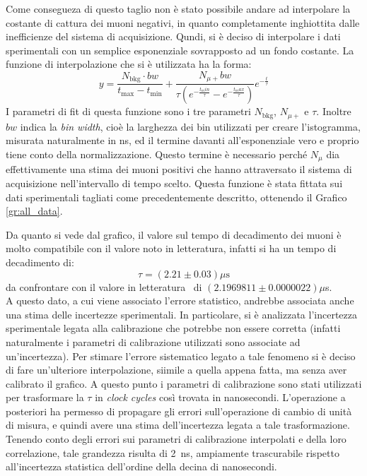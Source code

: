 Come consegueza di questo taglio non è stato possibile andare ad interpolare la costante di cattura dei muoni negativi, in quanto completamente inghiottita dalle inefficienze del sistema di acquisizione. Qundi, si è deciso di interpolare i dati sperimentali con un semplice esponenziale sovrapposto ad un fondo costante. La funzione di interpolazione che si è utilizzata ha la forma:
\begin{equation}
  y = \frac{N_\text{bkg} \cdot bw}{t_\text{max}-t_\text{min}}+\frac{N_{\mu+}bw}{\tau \left(e^{-\frac{t_min}{\tau}} - e^{-\frac{t_max}{\tau}}\right)}
  e^{-\frac{t}{\tau}} 
\end{equation}
I parametri di fit di questa funzione sono i tre parametri $N_\text{bkg}$, $N_{\mu+}$ e $\tau$. Inoltre $bw$ indica la \textit{bin width}, cioè la larghezza dei bin utilizzati per creare l'istogramma, misurata naturalmente in ns, ed il termine davanti all'esponenziale vero e proprio tiene conto della normalizzazione. Questo termine è necessario perché $N_\mu$ dia effettivamente una stima dei muoni positivi che hanno attraversato il sistema di acquisizione nell'intervallo di tempo scelto. Questa funzione è stata fittata sui dati sperimentali tagliati come precedentemente descritto, ottenendo il Grafico \ref{gr:all_data}.\\

Da quanto si vede dal grafico, il valore sul tempo di decadimento dei muoni è molto compatibile con il valore noto in  letteratura, infatti si ha un tempo di decadimento di:
\begin{equation}
  \tau = (2.21 \pm 0.03) \mu\text{s}
\end{equation}
da confrontare con il valore in letteratura~\cite{bib:Patrignani:2016xqp} di $(2.1969811 \pm 0.0000022) \mu$s.\\

A questo dato, a cui viene associato l'errore statistico, andrebbe associata anche una stima delle incertezze sperimentali. In particolare, si è analizzata l'incertezza sperimentale legata alla calibrazione che potrebbe non essere corretta (infatti naturalmente i parametri di calibrazione utilizzati sono associate ad un'incertezza). Per  stimare l'errore sistematico legato a tale fenomeno si è deciso di fare un'ulteriore interpolazione, siimile a quella appena fatta, ma senza aver calibrato il  grafico. A questo punto i parametri di calibrazione sono stati utilizzati per trasformare la $\tau$ in \textit{clock cycles} così trovata in nanosecondi. L'operazione a posteriori ha permesso di propagare gli errori sull'operazione di cambio di unità di misura, e quindi avere una stima dell'incertezza legata a tale trasformazione. Tenendo conto degli errori sui parametri di calibrazione interpolati e della loro correlazione, tale grandezza risulta di 2~ns, ampiamente trascurabile rispetto all'incertezza statistica dell'ordine della decina di nanosecondi.

